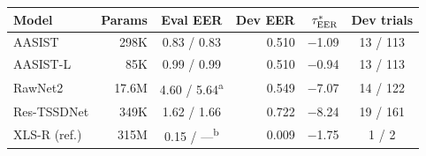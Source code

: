 \begin{tabular}{@{}lrcrrc@{}}
\toprule
Model & Params & Eval EER & Dev EER & $\tau^{*}_{\mathrm{EER}}$ & Dev trials \\
\midrule
AASIST & 298K & 0.83 / 0.83 & 0.510 & $-$1.09 & 13 / 113 \\
AASIST-L & 85K & 0.99 / 0.99 & 0.510 & $-$0.94 & 13 / 113 \\
RawNet2 & 17.6M & 4.60 / 5.64\textsuperscript{a} & 0.549 & $-$7.07 & 14 / 122 \\
Res-TSSDNet & 349K & 1.62 / 1.66 & 0.722 & $-$8.24 & 19 / 161 \\
XLS-R (ref.) & 315M & 0.15 / ---\textsuperscript{b} & 0.009 & $-$1.75 & 1 / 2 \\
\bottomrule
\end{tabular}

